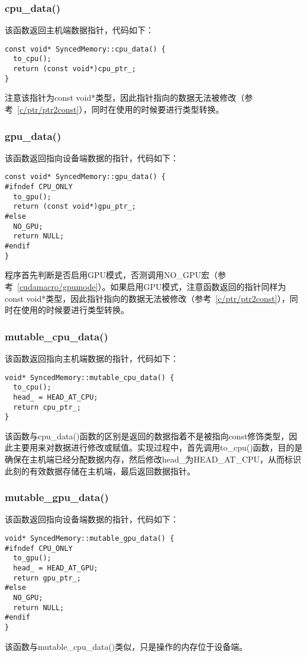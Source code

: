 \subsubsection{cpu\_data()}
该函数返回主机端数据指针，代码如下：
\begin{verbatim}
const void* SyncedMemory::cpu_data() {
  to_cpu();
  return (const void*)cpu_ptr_;
}
\end{verbatim}
注意该指针为const void*类型，因此指针指向的数据无法被修改（参考~\ref{c/ptr/ptr2const}），同时在使用的时候要进行类型转换。
\subsubsection{gpu\_data()}
该函数返回指向设备端数据的指针，代码如下：
\begin{verbatim}
const void* SyncedMemory::gpu_data() {
#ifndef CPU_ONLY
  to_gpu();
  return (const void*)gpu_ptr_;
#else
  NO_GPU;
  return NULL;
#endif
}
\end{verbatim}
程序首先判断是否启用GPU模式，否测调用NO\_GPU宏（参考~\ref{cudamacro/gpumode}）。如果启用GPU模式，注意函数返回的指针同样为const void*类型，因此指针指向的数据无法被修改（参考~\ref{c/ptr/ptr2const}），同时在使用的时候要进行类型转换。
\subsubsection{mutable\_cpu\_data()}
该函数返回指向主机端数据的指针，代码如下：
\begin{verbatim}
void* SyncedMemory::mutable_cpu_data() {
  to_cpu();
  head_ = HEAD_AT_CPU;
  return cpu_ptr_;
}
\end{verbatim}
该函数与cpu\_data()函数的区别是返回的数据指着不是被指向const修饰类型，因此主要用来对数据进行修改或赋值。实现过程中，首先调用to\_cpu()函数，目的是确保在主机端已经分配数据内存，然后修改head\_为HEAD\_AT\_CPU，从而标识此刻的有效数据存储在主机端，最后返回数据指针。
\subsubsection{mutable\_gpu\_data()}
该函数返回指向设备端数据的指针，代码如下：
\begin{verbatim}
void* SyncedMemory::mutable_gpu_data() {
#ifndef CPU_ONLY
  to_gpu();
  head_ = HEAD_AT_GPU;
  return gpu_ptr_;
#else
  NO_GPU;
  return NULL;
#endif
}
\end{verbatim}
该函数与mutable\_cpu\_data()类似，只是操作的内存位于设备端。
